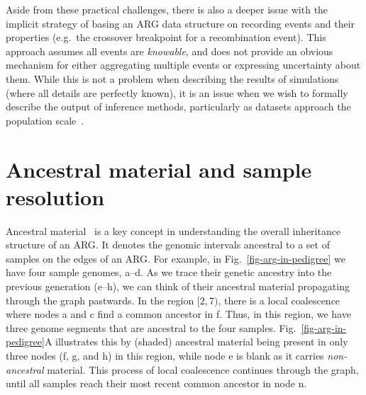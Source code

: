 \documentclass{article}
\newcommand{\noderef}[1]{\textsf{#1}}
\begin{document}
Aside from these practical challenges, there is also a deeper
issue with the implicit strategy of basing an ARG data structure on
recording events and their properties (e.g.\ the crossover breakpoint
for a recombination event). This approach assumes all events are 
\emph{knowable}, and does not
provide an obvious mechanism for either aggregating multiple events
or expressing uncertainty about them. While this is not a
problem when describing the results of simulations (where all details
are perfectly known), it is an issue when we wish to
formally describe the output of inference methods, particularly
as datasets approach the population scale~\citep[e.g.][]{
turnbull2018hundred, bycroft2018genome,hayes20191000,
Ros-Freixedes2020,karczewski2020mutational,tanjo2021practical,
halldorsson2022sequences}.


\section{Ancestral material and sample resolution}
\label{sec-ancestral-material}
Ancestral material~\citep{wiuf1999ancestry,wiuf1999recombination}
is a key concept in understanding the overall inheritance structure
of an ARG.
It denotes the genomic intervals ancestral to a set of samples
on the edges of an ARG.
For example, in Fig.~\ref{fig-arg-in-pedigree} we have
four sample genomes, \noderef{a}--\noderef{d}. As we
trace their genetic ancestry into the previous generation
(\noderef{e}--\noderef{h}), we can think of their ancestral
material propagating through the graph
pastwards. In the region $[2, 7)$, there is a
local coalescence where nodes \noderef{a} and \noderef{c}
find a common ancestor in \noderef{f}. Thus, in this region,
we have three genome segments that are ancestral to the
four samples. Fig.~\ref{fig-arg-in-pedigree}A
illustrates this by (shaded) ancestral material being present
in only three nodes (\noderef{f}, \noderef{g}, and \noderef{h}) in this region,
while node \noderef{e} is blank
as it carries \emph{non-ancestral} material.
This process of local coalescence continues through the
graph, until all samples reach their most recent common
ancestor in node \noderef{n}.
\end{document}
